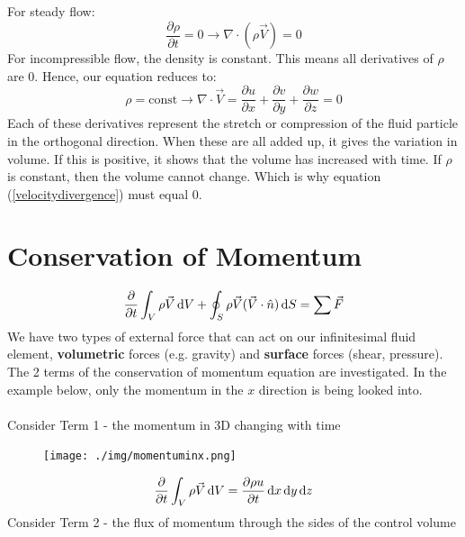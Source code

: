 For steady flow:
\begin{equation}
  \frac{\partial \rho}{\partial t} = 0 \rightarrow \nabla \cdot (\rho \vec{V}) = 0
\end{equation}
For incompressible flow, the density is constant. This means all derivatives of $\rho$ are 0. Hence, our equation reduces to:
\begin{equation}
  \rho = \textrm{const} \rightarrow \nabla \cdot \vec{V} = \frac{\partial u}{\partial x} + \frac{\partial v}{\partial y} + \frac{\partial w}{\partial z} = 0
  \label{velocitydivergence}
\end{equation}
Each of these derivatives represent the stretch or compression of the fluid particle in the orthogonal direction. When these are all added up, it gives the variation in volume. If this is positive, it shows that the volume has increased with time. If $\rho$ is constant, then the volume cannot change. Which is why equation (\ref{velocitydivergence}) must equal 0.
\section{Conservation of Momentum}
\begin{equation}
  \frac{\partial}{\partial t} \int_V \rho \vec{V} \dif V + \oint_S \rho \vec{V}(\vec{V} \cdot \hat{n}) \dif S = \sum \vec{F}
  \label{conservationofmomentum}
\end{equation}
We have two types of external force that can act on our infinitesimal fluid element, \textbf{volumetric} forces (e.g. gravity) and \textbf{surface} forces (shear, pressure). The 2 terms of the conservation of momentum equation are investigated. In the example below, only the momentum in the $x$ direction is being looked into. \\\\
Consider Term 1 - the momentum in 3D changing with time
\begin{figure}[H]
  \centering
  \texttt{[image: ./img/momentuminx.png]}
\end{figure}
\begin{gather}
  \frac{\partial}{\partial t} \int_V \rho \vec{V} \dif V = \frac{\partial \rho u}{\partial t}\dif x \dif y \dif z
  \label{momentumin3d}
\end{gather}
Consider Term 2 - the flux of momentum through the sides of the control volume \\
